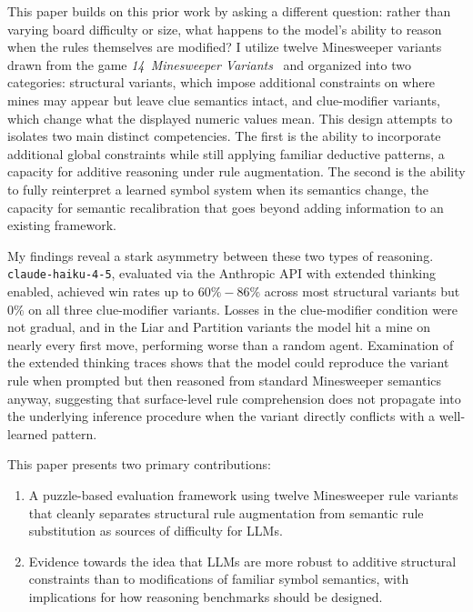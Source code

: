\documentclass[11pt,conference,compsoc]{IEEEtran}
\begin{document}
This paper builds on this prior work by asking a different question: rather than varying board difficulty or size, what happens to the model's ability to reason when the rules themselves are modified? I utilize twelve Minesweeper variants drawn from the game \textit{14~Minesweeper Variants}~\cite{artlessgames2022minesweeper} and organized into two categories: structural variants, which impose additional constraints on where mines may appear but leave clue semantics intact, and clue-modifier variants, which change what the displayed numeric values mean. This design attempts to isolates two main distinct competencies. The first is the ability to incorporate additional global constraints while still applying familiar deductive patterns, a capacity for additive reasoning under rule augmentation. The second is the ability to fully reinterpret a learned symbol system when its semantics change, the capacity for semantic recalibration that goes beyond adding information to an existing framework.

My findings reveal a stark asymmetry between these two types of reasoning. \texttt{claude-haiku-4-5}, evaluated via the Anthropic API with extended thinking enabled, achieved win rates up to $60\%-86\%$ across most structural variants but $0\%$ on all three clue-modifier variants. Losses in the clue-modifier condition were not gradual, and in the Liar and Partition variants the model hit a mine on nearly every first move, performing worse than a random agent.
Examination of the extended thinking traces shows that the model could reproduce the variant rule when prompted but then reasoned from standard Minesweeper semantics anyway, suggesting that surface-level rule comprehension does not propagate into the underlying inference procedure when the variant directly conflicts with a well-learned pattern.

This paper presents two primary contributions:
\begin{enumerate}
    \item A puzzle-based evaluation framework using twelve Minesweeper rule variants
          that cleanly separates structural rule augmentation from semantic rule
          substitution as sources of difficulty for LLMs.
    \item Evidence towards the idea that LLMs are more robust to additive
          structural constraints than to modifications of familiar symbol semantics,
          with implications for how reasoning benchmarks should be designed.
\end{enumerate}
\end{document}
